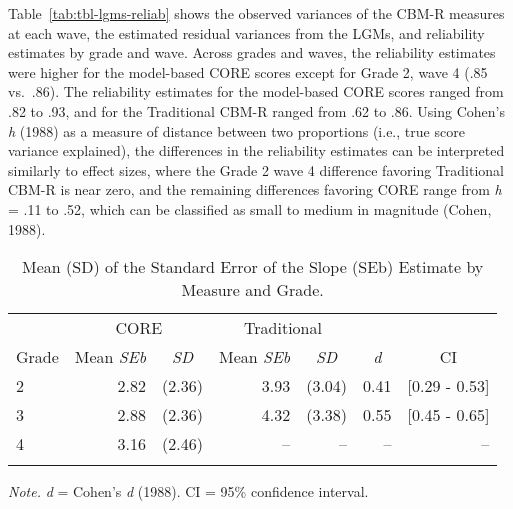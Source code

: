 \documentclass[
  english,
  man, fleqn, noextraspace]{apa6}
\begin{document}
Table~\ref{tab:tbl-lgms-reliab} shows the observed variances of the CBM-R measures at each wave, the estimated residual variances from the LGMs, and reliability estimates by grade and wave. Across grades and waves, the reliability estimates were higher for the model-based CORE scores except for Grade 2, wave 4 (.85 vs.~.86). The reliability estimates for the model-based CORE scores ranged from .82 to .93, and for the Traditional CBM-R ranged from .62 to .86. Using Cohen's \emph{h} (1988) as a measure of distance between two proportions (i.e., true score variance explained), the differences in the reliability estimates can be interpreted similarly to effect sizes, where the Grade 2 wave 4 difference favoring Traditional CBM-R is near zero, and the remaining differences favoring CORE range from \emph{h} = .11 to .52, which can be classified as small to medium in magnitude (Cohen, 1988).



\begin{table}[tbp]

\begin{center}
\begin{threeparttable}

\caption{\label{tab:tbl-seb-results}Mean (SD) of the Standard Error of the Slope (SEb) Estimate by Measure and Grade.}

\begin{tabular}{lrrrrrr}
\toprule
 & \multicolumn{2}{c}{CORE} & \multicolumn{2}{c}{Traditional}  &  &\\
\cmidrule(r){2-3} \cmidrule(r){4-5}
Grade & \multicolumn{1}{c}{Mean \emph{SEb}} & \multicolumn{1}{c}{\emph{SD}} & \multicolumn{1}{c}{Mean \emph{SEb}} & \multicolumn{1}{c}{\emph{SD}} & \multicolumn{1}{c}{\emph{d}} & \multicolumn{1}{c}{CI}\\
\midrule
2 & 2.82 & (2.36) & 3.93 & (3.04) & 0.41 & {}[0.29 - 0.53]\\
3 & 2.88 & (2.36) & 4.32 & (3.38) & 0.55 & {}[0.45 - 0.65]\\
4 & 3.16 & (2.46) & -- & -- & -- & --\\
\bottomrule
\addlinespace
\end{tabular}

\begin{tablenotes}[para]
\normalsize{\textit{Note.} \emph{d} = Cohen's \emph{d} (1988). CI = 95\% confidence interval.}
\end{tablenotes}

\end{threeparttable}
\end{center}

\end{table}
\end{document}

